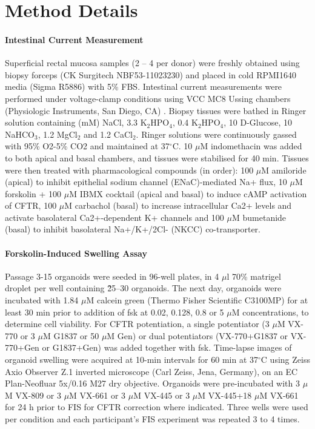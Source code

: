 \section{Method Details}
\paragraph{Intestinal Current Measurement} Superficial rectal mucosa samples (2 – 4 per donor) were freshly obtained using biopsy forceps (CK Surgitech NBF53-11023230) and placed in cold RPMI1640 media (Sigma R5886) with 5\% FBS. Intestinal current measurements were performed under voltage-clamp conditions using VCC MC8 Ussing chambers (Physiologic Instruments, San Diego, CA) \cite{dejonge2004, derichs2010, li2004}. Biopsy tissues were bathed in Ringer solution containing (mM) NaCl, 3.3 K$_2$HPO$_4$, 0.4 K$_2$HPO$_4$, 10 D-Glucose, 10 NaHCO$_3$, 1.2 MgCl$_2$ and 1.2 CaCl$_2$. Ringer solutions were continuously gassed with 95\% O2-5\% CO2 and maintained at 37$^\circ$C. 10 $\mu$M indomethacin was added to both apical and basal chambers, and tissues were stabilised for 40 min. Tissues were then treated with pharmacological compounds (in order): 100 $\mu$M amiloride (apical) to inhibit epithelial sodium channel (ENaC)-mediated Na+ flux, 10 $\mu$M forskolin + 100 $\mu$M IBMX cocktail (apical and basal) to induce cAMP activation of CFTR, 100 $\mu$M carbachol (basal) to increase intracellular Ca2+ levels and activate basolateral Ca2+-dependent K+ channels and 100 $\mu$M bumetanide (basal) to inhibit basolateral Na+/K+/2Cl- (NKCC) co-transporter.

\paragraph{Forskolin-Induced Swelling Assay} Passage 3-15 organoids were seeded in 96-well plates, in 4 $\mu$l 70\% matrigel droplet per well containing \~25–30 organoids. The next day, organoids were incubated with 1.84 $\mu$M calcein green (Thermo Fisher Scientific C3100MP) for at least 30 min prior to addition of fsk at 0.02, 0.128, 0.8 or 5 $\mu$M concentrations, to determine cell viability. For CFTR potentiation, a single potentiator (3 $\mu$M VX-770 or 3 $\mu$M G1837 or 50 $\mu$M Gen) or dual potentiators (VX-770+G1837 or VX-770+Gen or G1837+Gen) was added together with fsk. Time-lapse images of organoid swelling were acquired at 10-min intervals for 60 min at 37$^\circ$C using Zeiss Axio Observer Z.1 inverted microscope (Carl Zeiss, Jena, Germany), on an EC Plan-Neofluar 5x/0.16 M27 dry objective. Organoids were pre-incubated with 3 $\mu$M VX-809 or 3 $\mu$M VX-661 or 3 $\mu$M VX-445 or 3 $\mu$M VX-445+18 $\mu$M VX-661 for 24 h prior to FIS for CFTR correction where indicated. Three wells were used per condition and each participant’s FIS experiment was repeated 3 to 4 times.

